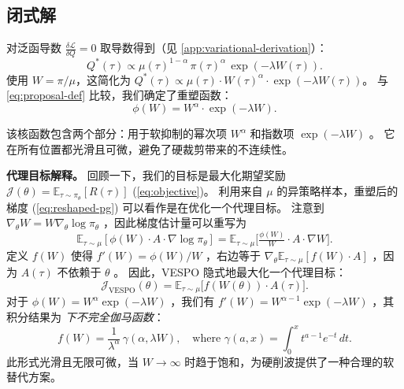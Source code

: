 \documentclass{article}
\theoremstyle{plain}
\theoremstyle{definition}
\theoremstyle{remark}
\begin{document}
\subsection{闭式解}
\label{sec:closed-form}

对泛函导数 $\frac{\delta \mathcal{L}}{\delta Q} = 0$ 取导数得到（见 \cref{app:variational-derivation}）：
\begin{equation}
  \label{eq:Q-solution}
  Q^*(\tau) \propto \mu(\tau)^{1-\alpha} \, \pi(\tau)^{\alpha} \, \exp(-\lambda W(\tau)).
\end{equation}
使用 $W = \pi/\mu$，这简化为 $Q^*(\tau) \propto \mu(\tau) \cdot W(\tau)^{\alpha} \cdot \exp(-\lambda W(\tau))$。  
与 \cref{eq:proposal-def} 比较，我们确定了重塑函数：
\begin{equation}
  \label{eq:gamma-kernel}
  \phi(W) = W^{\alpha} \cdot \exp(-\lambda W).
\end{equation}

该核函数包含两个部分：用于软抑制的幂次项 $W^\alpha$  和指数项 $\exp(-\lambda W)$ 。  
它在所有位置都光滑且可微，避免了硬裁剪带来的不连续性。

\textbf{代理目标解释。}
回顾一下，我们的目标是最大化期望奖励 $\mathcal{J}(\theta) = \mathbb{E}_{\tau \sim \pi_\theta}[R(\tau)]$  (\cref{eq:objective})。
利用来自 $\mu$ 的异策略样本，重塑后的梯度 (\cref{eq:reshaped-pg}) 可以看作是在优化一个代理目标。
注意到 $\nabla_\theta W = W \nabla_\theta \log \pi_\theta$ ，因此梯度估计量可以重写为
\begin{equation}
  \label{eq:grad-rewrite}
  \mathbb{E}_{\tau \sim \mu}[\phi(W) \cdot A \cdot \nabla \log \pi_\theta] = \mathbb{E}_{\tau \sim \mu}\bigl[\tfrac{\phi(W)}{W} \cdot A \cdot \nabla W\bigr].
\end{equation}
定义 $f(W)$ 使得 $f'(W) = \phi(W)/W$ ，右边等于 $\nabla_\theta \mathbb{E}_{\tau \sim \mu}[f(W) \cdot A]$ ，因为 $A(\tau)$ 不依赖于 $\theta$ 。  
因此，VESPO 隐式地最大化一个代理目标：
\begin{equation}
  \label{eq:surrogate-obj}
  \mathcal{J}_{\text{VESPO}}(\theta) = \mathbb{E}_{\tau \sim \mu}\bigl[f(W(\theta)) \cdot A(\tau)\bigr].
\end{equation}
对于 $\phi(W) = W^\alpha \exp(-\lambda W)$ ，我们有 $f'(W) = W^{\alpha-1} \exp(-\lambda W)$ ，其积分结果为 \emph{下不完全伽马函数}：
\begin{equation}
  \label{eq:f-gamma}
  f(W) = \frac{1}{\lambda^\alpha} \, \gamma(\alpha, \lambda W), \quad \text{where } \gamma(a, x) = \int_0^x t^{a-1} e^{-t} \, dt.
\end{equation}
此形式光滑且无限可微，当 $W \to \infty$ 时趋于饱和，为硬削波提供了一种合理的软替代方案。
\end{document}
